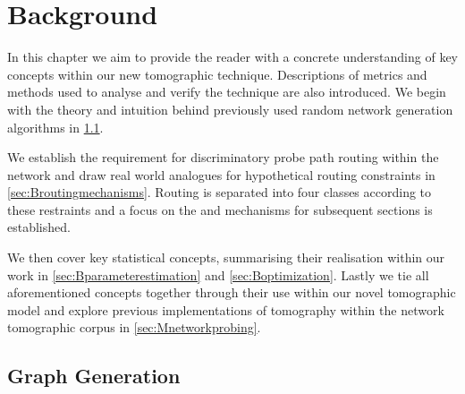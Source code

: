 \chapter{Background}
\label{cha:background}

In this chapter we aim to provide the reader with a concrete understanding of key concepts within our new tomographic technique. Descriptions of metrics and methods used to analyse and verify the technique are also introduced. We begin with the theory and intuition behind previously used random network generation algorithms in \cref{sec:Bgraphgeneration}.\par
We establish the requirement for discriminatory probe path routing within the network and draw real world analogues for hypothetical routing constraints in \cref{sec:Broutingmechanisms}. Routing is separated into four classes according to these restraints and a focus on the \cbr and \cfr mechanisms for subsequent sections is established.\par
We then cover key statistical concepts, summarising their realisation within our work in \cref{sec:Bparameterestimation} and \cref{sec:Boptimization}. Lastly we tie all aforementioned concepts together through their use within our novel tomographic model and explore previous implementations of \pdv tomography within the network tomographic corpus in \cref{sec:Mnetworkprobing}.

\section{Graph Generation}
\label{sec:Bgraphgeneration}

